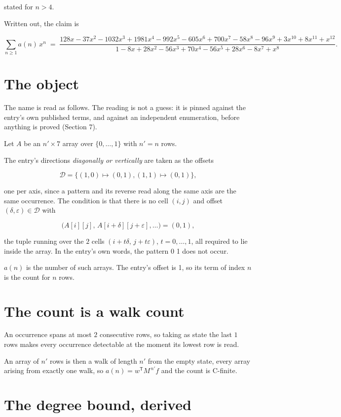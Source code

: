 \documentclass[11pt]{article}
\theoremstyle{definition}
\begin{document}
stated for $n > 4$.

Written out, the claim is

\[\sum_{n \ge 1} a(n)\,x^n \;=\; \frac{128x - 37x^{2} - 1032x^{3} + 1981x^{4} - 992x^{5} - 605x^{6} + 700x^{7} - 58x^{8} - 96x^{9} + 3x^{10} + 8x^{11} + x^{12}}{1 - 8x + 28x^{2} - 56x^{3} + 70x^{4} - 56x^{5} + 28x^{6} - 8x^{7} + x^{8}}.\]

\section{The object}

The name is read as follows. The reading is not a guess: it is pinned against the entry's own published terms, and against an independent enumeration, before anything is proved (Section 7).

Let $A$ be an $n' \times 7$ array over $\{0,\dots,1\}$ with $n' = n$ rows.

The entry's directions {\itshape diagonally or vertically} are taken as the offsets

\[\mathcal{D} = \{(1,0)\mapsto(0,1), (1,1)\mapsto(0,1)\},\]

one per axis, since a pattern and its reverse read along the same axis are the same occurrence. The condition is that there is no cell $(i,j)$ and offset $(\delta,\varepsilon)\in\mathcal{D}$ with

\[\bigl(A[i][j],\,A[i{+}\delta][j{+}\varepsilon],\dots\bigr) = (0, 1),\]

the tuple running over the $2$ cells $(i+t\delta,\,j+t\varepsilon)$, $t = 0,\dots,1$, all required to lie inside the array. In the entry's own words, the pattern 0 1 does not occur.

$a(n)$ is the number of such arrays. The entry's offset is 1, so its term of index $n$ is the count for $n$ rows.

\section{The count is a walk count}

An occurrence spans at most $2$ consecutive rows, so taking as state the last $1$ rows makes every occurrence detectable at the moment its lowest row is read.

An array of $n'$ rows is then a walk of length $n'$ from the empty state, every array arising from exactly one walk, so $a(n) = w^{\mathsf T}M^{\,n'}f$ and the count is C-finite.

\section{The degree bound, derived}
\end{document}
